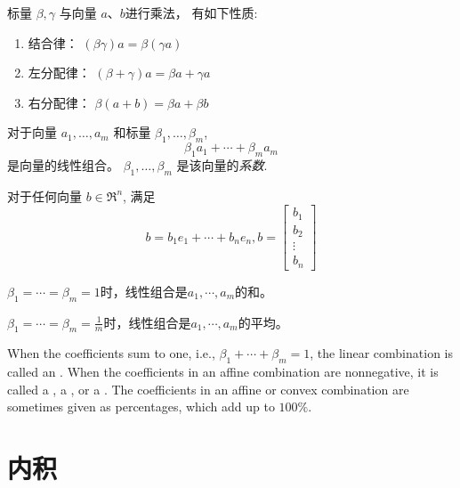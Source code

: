 \begin{theorem}
    标量 $  \beta, \gamma  $ 与向量 $  a 、 b  $进行乘法， 有如下性质:
    \begin{enumerate}
        \item 结合律： $  (\beta \gamma) a=\beta(\gamma a)  $
        \item 左分配律： $  (\beta+\gamma) a=\beta a+\gamma a  $
        \item 右分配律： $  \beta(a+b)=\beta a+\beta b  $
    \end{enumerate}
\end{theorem}

\begin{definition}[线性组合]
    对于向量 $  a_{1}, \ldots, a_{m}  $ 和标量 $  \beta_{1}, \ldots, \beta_{m}  $,
    \begin{equation} \beta_{1} a_{1}+\cdots+\beta_{m} a_{m} \end{equation}
    是向量的线性组合。 $  \beta_{1}, \ldots, \beta_{m}  $ 是该向量的\textit{系数}. 
\end{definition}



    \begin{theorem}
        对于任何向量 $  b \in \mathfrak{R}^{n}  $, 满足
    \begin{equation} b=b_{1} e_{1}+\cdots+b_{n} e_{n}, b=\left[\begin{array}{c}b_{1} \\ b_{2} \\ \vdots \\ b_{n}\end{array}\right] \end{equation}
    \end{theorem}
    
    $ \beta_{1}=\cdots=\beta_{m}=1 $时，线性组合是$a_1, \cdots, a_m$的和。

    $ \beta_{1}=\cdots=\beta_{m} = \frac{1}{m} $时，线性组合是$a_1, \cdots, a_m$的平均。

    When the coefficients sum to one, i.e., $ \beta_{1}+\cdots+\beta_{m}=1 $, the linear combination is called an . When the coefficients in an affine combination are nonnegative, it is called a , a , or a . The coefficients in an affine or convex combination are sometimes given as percentages, which add up to $ 100 \% $.

\section{内积}

